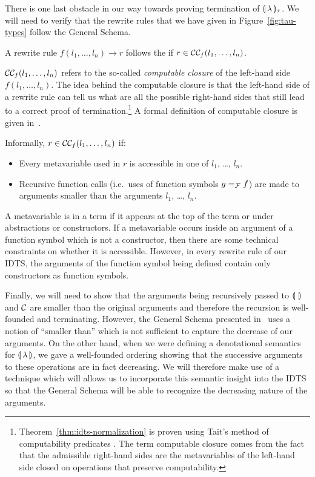 There is one last obstacle in our way towards proving termination of
$\llparenthesis \, \lambda \, \rrparenthesis_\tau$. We will need to verify that the rewrite rules that
we have given in Figure~\ref{fig:tau-types} follow the General Schema.

\begin{definition}
  A rewrite rule $f(l_1, \ldots, l_n) \to r$ follows the  if $r \in \mathcal{C}\mathcal{C}_f(l_1, \ldots, l_n)$.
\end{definition}

$\mathcal{C}\mathcal{C}_f(l_1, \ldots, l_n)$ refers to the so-called \emph{computable
  closure} of the left-hand side $f(l_1, \ldots, l_n)$. The idea behind the
computable closure is that the left-hand side of a rewrite rule can tell us
what are all the possible right-hand sides that still lead to a correct
proof of termination.\footnote{Theorem~\ref{thm:idts-normalization} is
  proven using Tait's method of computability predicates
  \cite{tait1967intensional}. The term computable closure comes from the
  fact that the admissible right-hand sides are the metavariables of the
  left-hand side closed on operations that preserve computability.} A
formal definition of computable closure is given
in~\cite[p. 8]{blanqui2000termination}.

Informally, $r \in \mathcal{C}\mathcal{C}_f(l_1, \ldots, l_n)$ if:
\begin{itemize}
\item Every metavariable used in $r$ is accessible in one of $l_1$, \ldots,
  $l_n$.
\item Recursive function calls (i.e.\ uses of function symbols $g =_{\mathcal{F}} f$)
  are made to arguments smaller than the arguments $l_1$, \ldots, $l_n$.
\end{itemize}

A metavariable is  in a term if it appears at the top of
the term or under abstractions or constructors. If a metavariable occurs
inside an argument of a function symbol which is not a constructor, then
there are some technical constraints on whether it is accessible. However,
in every rewrite rule of our IDTS, the arguments of the function symbol
being defined contain only constructors as function symbols.

Finally, we will need to show that the arguments being recursively passed
to $\llparenthesis \,  \, \rrparenthesis$ and $\mathcal{C}$ are smaller than the original arguments and
therefore the recursion is well-founded and terminating. However, the
General Schema presented in~\cite{blanqui2000termination} uses a notion of
``smaller than'' which is not sufficient to capture the decrease of our
arguments. On the other hand, when we were defining a denotational
semantics for $\llparenthesis \, \lambda \, \rrparenthesis$, we gave a well-founded ordering showing
that the successive arguments to these operations are in fact
decreasing. We will therefore make use of a technique which will allows us
to incorporate this semantic insight into the IDTS so that the General
Schema will be able to recognize the decreasing nature of the arguments.


